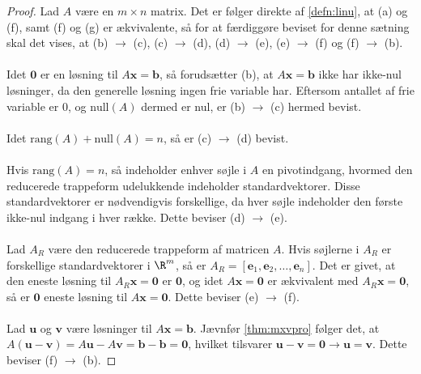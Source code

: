 \begin{proof}
Lad $A$ være en $m \times n$ matrix.
Det er følger direkte af \ref{defn:linu}, at (a) og (f), samt (f) og (g) er ækvivalente, så for at færdiggøre beviset for denne sætning skal det vises, at (b) $\rightarrow$ (c), (c) $\rightarrow$ (d), (d) $\rightarrow$ (e), (e) $\rightarrow$ (f) og (f) $\rightarrow$ (b).
\\\\
Idet $\mathbf{0}$ er en løsning til $A\mathbf{x}=\mathbf{b}$, så forudsætter (b), at $A\mathbf{x}=\mathbf{b}$ ikke har ikke-nul løsninger, da den generelle løsning ingen frie variable har. 
Eftersom antallet af frie variable er $0$, og $\text{null}(A)$ dermed er nul, er (b) $\rightarrow$ (c) hermed bevist. 
\\\\
Idet $\text{rang}(A)+\text{null}(A)=n$, så er (c) $\rightarrow$ (d) bevist.
\\\\
%
Hvis $\text{rang}(A)=n$, så indeholder enhver søjle i $A$ en pivotindgang, hvormed den reducerede trappeform udelukkende indeholder standardvektorer. 
Disse standardvektorer er nødvendigvis forskellige, da hver søjle indeholder den første ikke-nul indgang i hver række. 
Dette beviser (d) $\rightarrow$ (e).
%
\\\\
Lad $A_R$ være den reducerede trappeform af matricen $A$. Hvis søjlerne i $A_R$ er forskellige standardvektorer i $\R^m$, så er $A_R= [ \mathbf{e}_1, \mathbf{e}_2, \ldots, \mathbf{e}_n]$. 
Det er givet, at den eneste løsning til $A_R\mathbf{x}=\mathbf{0}$ er $\mathbf{0}$, og idet $A\mathbf{x}=\mathbf{0}$ er ækvivalent med $A_R\mathbf{x}=\mathbf{0}$, så er $\mathbf{0}$ eneste løsning til $A\mathbf{x}=\mathbf{0}$. 
Dette beviser (e) $\rightarrow$ (f).
\\\\
%
Lad $\mathbf{u}$ og $\mathbf{v}$ være løsninger til $A\mathbf{x}=\mathbf{b}$.
Jævnfør \ref{thm:mxvpro} følger det, at $A(\mathbf{u}-\mathbf{v})=A\mathbf{u}-A\mathbf{v}=\mathbf{b}-\mathbf{b}=\mathbf{0}$, hvilket tilsvarer $\mathbf{u}-\mathbf{v}=\mathbf{0}
\rightarrow  
\mathbf{u} =\mathbf{v}$. Dette beviser (f) $\rightarrow$ (b).
%
%
\end{proof}
